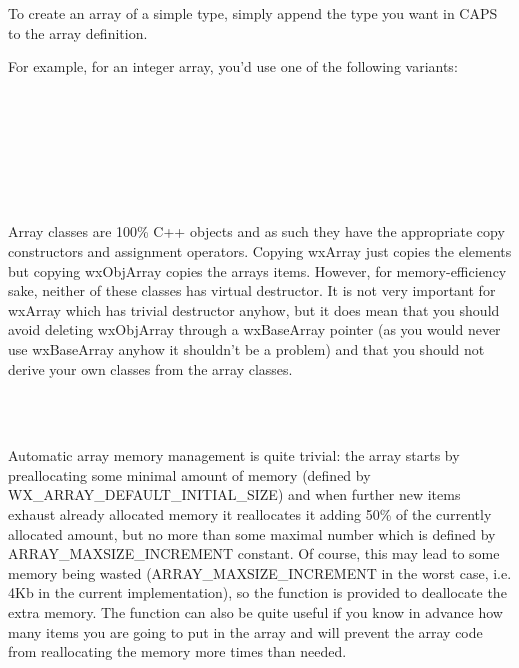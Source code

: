 To create an array of a simple type, simply append the type you want in CAPS to
the array definition.

For example, for an integer array, you'd use one of the following variants:

\\
\\
\\
\\
\\
\\

\label{arrayconstructorsdestructors}

Array classes are 100\% C++ objects and as such they have the appropriate copy
constructors and assignment operators. Copying wxArray just copies the elements
but copying wxObjArray copies the arrays items. However, for memory-efficiency
sake, neither of these classes has virtual destructor. It is not very important
for wxArray which has trivial destructor anyhow, but it does mean that you
should avoid deleting wxObjArray through a wxBaseArray pointer (as you would
never use wxBaseArray anyhow it shouldn't be a problem) and that you should not
derive your own classes from the array classes.

\\
\\

\label{wxarraymemorymanagement}

Automatic array memory management is quite trivial: the array starts by
preallocating some minimal amount of memory (defined by
WX\_ARRAY\_DEFAULT\_INITIAL\_SIZE) and when further new items exhaust already
allocated memory it reallocates it adding 50\% of the currently allocated
amount, but no more than some maximal number which is defined by
ARRAY\_MAXSIZE\_INCREMENT constant. Of course, this may lead to some memory
being wasted (ARRAY\_MAXSIZE\_INCREMENT in the worst case, i.e. 4Kb in the
current implementation), so the  function is
provided to deallocate the extra memory. The 
function can also be quite useful if you know in advance how many items you are
going to put in the array and will prevent the array code from reallocating the
memory more times than needed.

